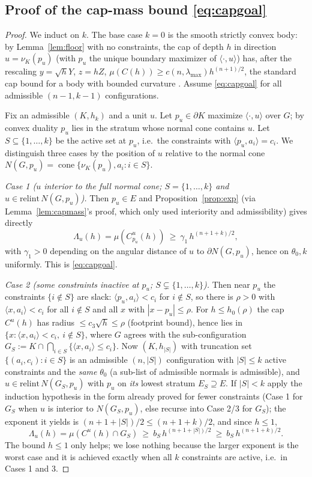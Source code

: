 \documentclass[11pt]{article}
\theoremstyle{definition}
\theoremstyle{remark}
\newcommand{\cone}{\operatorname{cone}}
\newcommand{\nor}{\nu_K}
\begin{document}
\subsection{Proof of the cap-mass bound \eqref{eq:capgoal}}

\begin{proof}
We induct on $k$.  The base case $k=0$ is the smooth strictly convex body: by
Lemma~\ref{lem:floor} with no constraints, the cap of depth $h$ in direction
$u=\nor(p_u)$ (with $p_u$ the unique boundary maximizer of $\langle\cdot,u
\rangle$) has, after the rescaling $y=\sqrt h Y$, $z=hZ$,
$\mu(C(h))\ge c(n,\lambda_{\max})h^{(n+1)/2}$, the standard cap bound for a
body with bounded curvature \cite{companion3}.  Assume \eqref{eq:capgoal} for
all admissible $(n-1,k-1)$ configurations.

Fix an admissible $(K,h_k)$ and a unit $u$.  Let
$p_u\in\partial K$ maximize $\langle\cdot,u\rangle$ over $G$; by convex duality
$p_u$ lies in the stratum whose normal cone contains $u$.  Let $S\subseteq
\{1,\dots,k\}$ be the active set at $p_u$, i.e.\ the constraints with
$\langle p_u,a_i\rangle=c_i$.  We distinguish three cases by the position of
$u$ relative to the normal cone $N(G,p_u)=\cone\{\nor(p_u),a_i:i\in S\}$.

\medskip
\emph{Case 1 ($u$ interior to the full normal cone; $S=\{1,\dots,k\}$ and $u\in
\mathrm{relint}\,N(G,p_u)$).}
Then $p_u\in E$ and Proposition~\ref{prop:exp} (via Lemma~\ref{lem:capmass}'s
proof, which only used interiority and admissibility) gives directly
\[
\Lambda_u(h)=\mu(C_{p_u}^u(h))\ \ge\ \gamma_1\,h^{(n+1+k)/2},
\]
with $\gamma_1>0$ depending on the angular distance of $u$ to
$\partial N(G,p_u)$, hence on $\theta_0,k$ uniformly.  This is
\eqref{eq:capgoal}.

\medskip
\emph{Case 2 (some constraints inactive at $p_u$; $S\subsetneq\{1,\dots,k\}$).}
Then near $p_u$ the constraints $\{i\notin S\}$ are slack:
$\langle p_u,a_i\rangle<c_i$ for $i\notin S$, so there is $\rho>0$ with
$\langle x,a_i\rangle<c_i$ for all $i\notin S$ and all $x$ with
$|x-p_u|\le\rho$.  For $h\le h_0(\rho)$ the cap $C^u(h)$ has radius
$\le c_3\sqrt h\le\rho$ (footprint bound), hence lies in
$\{x:\langle x,a_i\rangle<c_i,\ i\notin S\}$, where $G$ agrees with the
sub-configuration $G_S:=K\cap\bigcap_{i\in S}\{\langle x,a_i\rangle\le c_i\}$.
Now $(K,h_{|S|})$ with truncation set $\{(a_i,c_i):i\in S\}$ is an admissible
$(n,|S|)$ configuration with $|S|\le k$ active constraints and the \emph{same}
$\theta_0$ (a sub-list of admissible normals is admissible), and $u\in
\mathrm{relint}\,N(G_S,p_u)$ with $p_u$ on \emph{its} lowest stratum
$E_S\supseteq E$.  If $|S|<k$ apply the induction hypothesis in the form
already proved for fewer constraints (Case 1 for $G_S$ when $u$ is interior to
$N(G_S,p_u)$, else recurse into Case 2/3 for $G_S$); the exponent it yields is
$(n+1+|S|)/2\le(n+1+k)/2$, and since $h\le1$,
\[
\Lambda_u(h)=\mu(C^u(h)\cap G_S)\ \ge\ b_S\,h^{(n+1+|S|)/2}\ \ge\
b_S\,h^{(n+1+k)/2}.
\]
The bound $h\le1$ only helps; we lose nothing because the larger exponent is
the worst case and it is achieved exactly when all $k$ constraints are active,
i.e.\ in Cases 1 and 3.


\end{proof}
\end{document}
